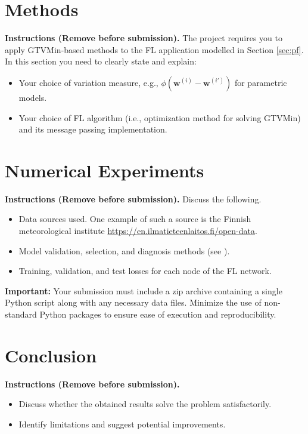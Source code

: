 \documentclass[9pt]{article}
\begin{document}
	\section{Methods}
	\label{sec:methods}
{\bf Instructions (Remove before submission).}
	The project requires you to apply GTVMin-based methods to 
	the FL application modelled in Section \ref{sec:pf}. In this section 
	you need to clearly state and explain:
		\begin{itemize}
			\item Your choice of variation measure, e.g., $\phi(\mathbf{w}^{(i)}-\mathbf{w}^{(i')})$ 
			for parametric models. 
			\item Your choice of FL algorithm (i.e., optimization method for solving 
			GTVMin) and its message passing implementation.
		\end{itemize}
	
	\section{Numerical Experiments}
	\label{sec:experiments}
	{\bf Instructions (Remove before submission).}
	Discuss the following.  
		\begin{itemize}
			\item Data sources used. One example of such a source is the Finnish meteorological institute \url{https://en.ilmatieteenlaitos.fi/open-data}. 
			\item Model validation, selection, and diagnosis methods (see \cite[Sec.~6.6]{Jung2022}).
			\item Training, validation, and test losses for each node of the FL network. 
		\end{itemize}
	

\textbf{Important:} Your submission must include a zip archive containing a single 
Python script along with any necessary data files. Minimize the use of non-standard 
Python packages to ensure ease of execution and reproducibility.

	
	\section{Conclusion}
	\label{sec:conclusion}
	{\bf Instructions (Remove before submission).}
		\begin{itemize}
			\item Discuss whether the obtained results solve the problem satisfactorily.
			\item Identify limitations and suggest potential improvements.
		\end{itemize}
	
\end{document}
